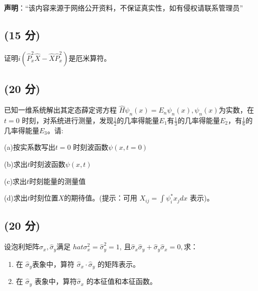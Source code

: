 
\textbf{声明}：“该内容来源于网络公开资料，不保证真实性，如有侵权请联系管理员”

\subsection{(15 分)}
证明$i\left(\hat{P}_x^2\hat{X} - \hat{X}\hat{P}_x^2\right)$是厄米算符。
\subsection{(20 分)}
已知一维系统解出其定态薛定谔方程 $\hat{H} \psi_n(x) = E_n \psi_n(x), \psi_n(x)$为实数，在 $t=0$ 时刻，对系统进行测量，发现$\frac{1}{2}$的几率得能量$E_1$有$\frac{1}{3}$的几率得能量$E_2$，有$\frac{1}{6}$的几率得能量$E_3$。请:

(a)按实系数写出$t=0$ 时刻波函数$\psi(x, t=0)$

(b)求出$t$时刻波函数$\psi(x, t)$

(c)求出$t$时刻能量的测量值

(d)求出$t$时刻位置$X$的期待值。(提示：可用  $X_{ij} = \int \psi_i^* x_j dx$ 表示)。
\subsection{(20 分)}
设泡利矩阵$\hat{\sigma}_x, \hat{\sigma}_y$满足 $hat{\sigma}_x^2 = \hat{\sigma}_y^2 = 1$, 且$\hat{\sigma}_x \hat{\sigma}_y + \hat{\sigma}_y \hat{\sigma}_x = 0,$求：

\begin{enumerate}
    \item 在 $\hat{\sigma}_y $表象中，算符 $\hat{\sigma}_x \cdot \hat{\sigma}_y$ 的矩阵表示。
    \item 在 $\hat{\sigma}_y$  表象中，算符$\hat{\sigma}_x $ 的本征值和本征函数。
\end{enumerate}